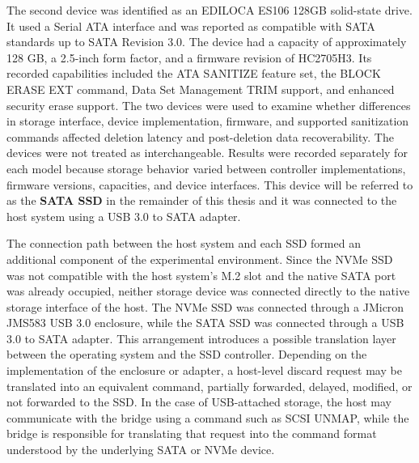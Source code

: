The second device was identified as an EDILOCA ES106 128GB solid-state drive. It used a Serial ATA interface and was reported as compatible with SATA standards up to SATA 
Revision 3.0. The device had a capacity of approximately 128 GB, a 2.5-inch form factor, and a firmware revision of HC2705H3. Its recorded capabilities 
included the ATA SANITIZE feature set, the BLOCK ERASE EXT command, Data Set Management TRIM support, and enhanced security erase support. The two devices 
were used to examine whether differences in storage interface, device implementation, firmware, and supported sanitization commands affected deletion latency 
and post-deletion data recoverability. The devices were not treated as interchangeable. Results were recorded separately for each model because storage 
behavior varied between controller implementations, firmware versions, capacities, and device interfaces. This device will be referred to as the \textbf{SATA SSD} in the remainder 
of this thesis and it was connected to the host system using a USB 3.0 to SATA adapter.

The connection path between the host system and each SSD formed an additional component of the experimental environment. Since the NVMe SSD was not compatible with the 
host system's M.2 slot and the native SATA port was already occupied, neither storage device was connected directly to the native storage interface of the host. The 
NVMe SSD was connected through a JMicron JMS583 USB 3.0 enclosure, while the SATA SSD was connected through a USB 3.0 to SATA adapter. This arrangement introduces a 
possible translation layer between the operating system and the SSD controller. Depending on the implementation of the enclosure or adapter, a host-level discard request 
may be translated into an equivalent command, partially forwarded, delayed, modified, or not forwarded to the SSD. In the case of USB-attached storage, the host may 
communicate with the bridge using a command such as SCSI UNMAP, while the bridge is responsible for translating that request into the command format understood by the 
underlying SATA or NVMe device. 

